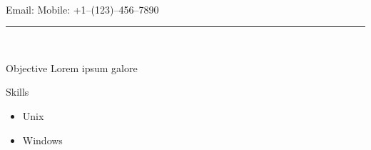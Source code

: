 \documentclass[]{custom-resume}
\begin{document}
  \vspace*{0.1cm} \\
  \indent Email: 
  \hspace{0.5cm} Mobile: +1--(123)--456--7890 \\
  \noindent \textcolor{HeadingColor}{\rule{\textwidth}{1pt}} \\

  \begin{CVSection}{Objective}
    Lorem ipsum galore
  \end{CVSection}

  \begin{CVSection}{Skills}
    \vspace{-\topsep}
    \begin{itemize}
      \item Unix
      \item Windows
    \end{itemize}
  \end{CVSection}
\end{document}
